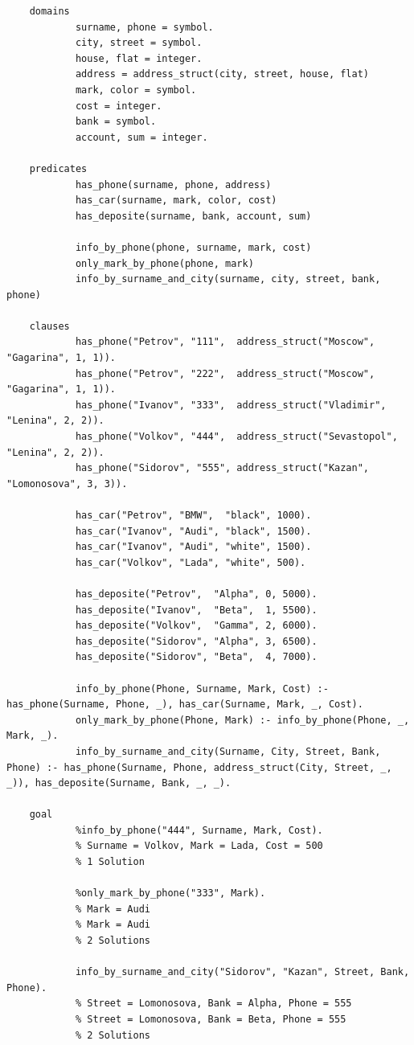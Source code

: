 \documentclass[12pt]{report}
\begin{document}
\begin{lstlisting}
	domains
			surname, phone = symbol.
			city, street = symbol.
			house, flat = integer.
			address = address_struct(city, street, house, flat)
			mark, color = symbol.
			cost = integer.
			bank = symbol.
			account, sum = integer.
	
	predicates
			has_phone(surname, phone, address)
			has_car(surname, mark, color, cost)
			has_deposite(surname, bank, account, sum)
	
			info_by_phone(phone, surname, mark, cost)
			only_mark_by_phone(phone, mark)
			info_by_surname_and_city(surname, city, street, bank, phone)
	
	clauses
			has_phone("Petrov", "111",  address_struct("Moscow",     "Gagarina", 1, 1)).
			has_phone("Petrov", "222",  address_struct("Moscow",     "Gagarina", 1, 1)).
			has_phone("Ivanov", "333",  address_struct("Vladimir",   "Lenina", 2, 2)).
			has_phone("Volkov", "444",  address_struct("Sevastopol", "Lenina", 2, 2)).
			has_phone("Sidorov", "555", address_struct("Kazan",      "Lomonosova", 3, 3)).
			
			has_car("Petrov", "BMW",  "black", 1000).
			has_car("Ivanov", "Audi", "black", 1500).
			has_car("Ivanov", "Audi", "white", 1500).
			has_car("Volkov", "Lada", "white", 500).
			
			has_deposite("Petrov",  "Alpha", 0, 5000).
			has_deposite("Ivanov",  "Beta",  1, 5500).
			has_deposite("Volkov",  "Gamma", 2, 6000).
			has_deposite("Sidorov", "Alpha", 3, 6500).
			has_deposite("Sidorov", "Beta",  4, 7000).
			
			info_by_phone(Phone, Surname, Mark, Cost) :- has_phone(Surname, Phone, _), has_car(Surname, Mark, _, Cost).
			only_mark_by_phone(Phone, Mark) :- info_by_phone(Phone, _, Mark, _).
			info_by_surname_and_city(Surname, City, Street, Bank, Phone) :- has_phone(Surname, Phone, address_struct(City, Street, _, _)), has_deposite(Surname, Bank, _, _).
	
	goal
			%info_by_phone("444", Surname, Mark, Cost).
			% Surname = Volkov, Mark = Lada, Cost = 500
			% 1 Solution
			
			%only_mark_by_phone("333", Mark).
			% Mark = Audi
			% Mark = Audi
			% 2 Solutions
			
			info_by_surname_and_city("Sidorov", "Kazan", Street, Bank, Phone).
			% Street = Lomonosova, Bank = Alpha, Phone = 555
			% Street = Lomonosova, Bank = Beta, Phone = 555
			% 2 Solutions
\end{lstlisting}
\end{document}
